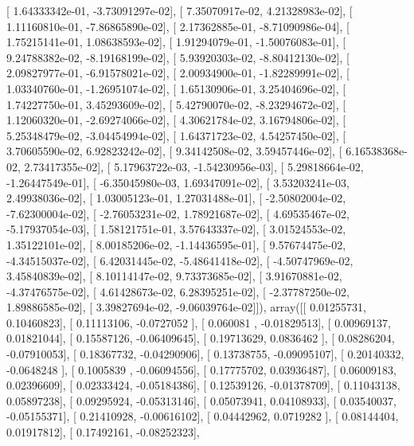 \documentclass{article}
\begin{document}
       [  1.64333342e-01,  -3.73091297e-02],
       [  7.35070917e-02,   4.21328983e-02],
       [  1.11160810e-01,  -7.86865890e-02],
       [  2.17362885e-01,  -8.71090986e-04],
       [  1.75215141e-01,   1.08638593e-02],
       [  1.91294079e-01,  -1.50076083e-01],
       [  9.24788382e-02,  -8.19168199e-02],
       [  5.93920303e-02,  -8.80412130e-02],
       [  2.09827977e-01,  -6.91578021e-02],
       [  2.00934900e-01,  -1.82289991e-02],
       [  1.03340760e-01,  -1.26951074e-02],
       [  1.65130906e-01,   3.25404696e-02],
       [  1.74227750e-01,   3.45293609e-02],
       [  5.42790070e-02,  -8.23294672e-02],
       [  1.12060320e-01,  -2.69274066e-02],
       [  4.30621784e-02,   3.16794806e-02],
       [  5.25348479e-02,  -3.04454994e-02],
       [  1.64371723e-02,   4.54257450e-02],
       [  3.70605590e-02,   6.92823242e-02],
       [  9.34142508e-02,   3.59457446e-02],
       [  6.16538368e-02,   2.73417355e-02],
       [  5.17963722e-03,  -1.54230956e-03],
       [  5.29818664e-02,  -1.26447549e-01],
       [ -6.35045980e-03,   1.69347091e-02],
       [  3.53203241e-03,   2.49938036e-02],
       [  1.03005123e-01,   1.27031488e-01],
       [ -2.50802004e-02,  -7.62300004e-02],
       [ -2.76053231e-02,   1.78921687e-02],
       [  4.69535467e-02,  -5.17937054e-03],
       [  1.58121751e-01,   3.57643337e-02],
       [  3.01524553e-02,   1.35122101e-02],
       [  8.00185206e-02,  -1.14436595e-01],
       [  9.57674475e-02,  -4.34515037e-02],
       [  6.42031445e-02,  -5.48641418e-02],
       [ -4.50747969e-02,   3.45840839e-02],
       [  8.10114147e-02,   9.73373685e-02],
       [  3.91670881e-02,  -4.37476575e-02],
       [  4.61428673e-02,   6.28395251e-02],
       [ -2.37787250e-02,   1.89886585e-02],
       [  3.39827694e-02,  -9.06039764e-02]]), array([[ 0.01255731,  0.10460823],
       [ 0.11113106, -0.0727052 ],
       [ 0.060081  , -0.01829513],
       [ 0.00969137,  0.01821044],
       [ 0.15587126, -0.06409645],
       [ 0.19713629,  0.0836462 ],
       [ 0.08286204, -0.07910053],
       [ 0.18367732, -0.04290906],
       [ 0.13738755, -0.09095107],
       [ 0.20140332, -0.0648248 ],
       [ 0.1005839 , -0.06094556],
       [ 0.17775702,  0.03936487],
       [ 0.06009183,  0.02396609],
       [ 0.02333424, -0.05184386],
       [ 0.12539126, -0.01378709],
       [ 0.11043138,  0.05897238],
       [ 0.09295924, -0.05313146],
       [ 0.05073941,  0.04108933],
       [ 0.03540037, -0.05155371],
       [ 0.21410928, -0.00616102],
       [ 0.04442962,  0.0719282 ],
       [ 0.08144404,  0.01917812],
       [ 0.17492161, -0.08252323],
\end{document}
